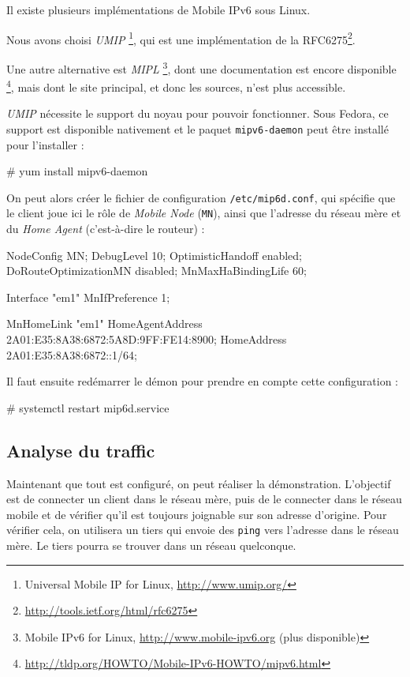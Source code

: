 Il existe plusieurs implémentations de Mobile IPv6 sous Linux.

Nous avons choisi \emph{UMIP} \footnote{Universal Mobile IP for Linux, \url{http://www.umip.org/}}, qui est une implémentation de la RFC6275\footnote{\url{http://tools.ietf.org/html/rfc6275}}.

Une autre alternative est \emph{MIPL} \footnote{Mobile IPv6 for Linux, \url{http://www.mobile-ipv6.org} (plus disponible)}, dont une documentation est encore disponible \footnote{\url{http://tldp.org/HOWTO/Mobile-IPv6-HOWTO/mipv6.html}}, mais dont le site principal, et donc les sources, n'est plus accessible.

\emph{UMIP} nécessite le support du noyau pour pouvoir fonctionner. Sous Fedora, ce support est disponible nativement et le paquet \texttt{mipv6-daemon} peut être installé pour l'installer :

\begin{code}
# yum install mipv6-daemon
\end{code}

On peut alors créer le fichier de configuration \texttt{/etc/mip6d.conf}, qui spécifie que le client joue ici le rôle de \emph{Mobile Node} (\texttt{MN}), ainsi que l'adresse du réseau mère et du \emph{Home Agent} (c'est-à-dire le routeur) :

\begin{code}
NodeConfig MN;
DebugLevel 10;
OptimisticHandoff enabled;
DoRouteOptimizationMN disabled;
MnMaxHaBindingLife 60;

Interface "em1" {
  MnIfPreference 1;
}

MnHomeLink "em1" {
  HomeAgentAddress 2A01:E35:8A38:6872:5A8D:9FF:FE14:8900;
  HomeAddress 2A01:E35:8A38:6872::1/64;
}
\end{code}

Il faut ensuite redémarrer le démon pour prendre en compte cette configuration :

\begin{code}
# systemctl restart mip6d.service
\end{code}

\subsection{Analyse du traffic}

Maintenant que tout est configuré, on peut réaliser la démonstration.
L'objectif est de connecter un client dans le réseau mère, puis de le connecter dans le réseau mobile et de vérifier qu'il est toujours joignable sur son adresse d'origine.
Pour vérifier cela, on utilisera un tiers qui envoie des \texttt{ping} vers l'adresse dans le réseau mère.
Le tiers pourra se trouver dans un réseau quelconque.

